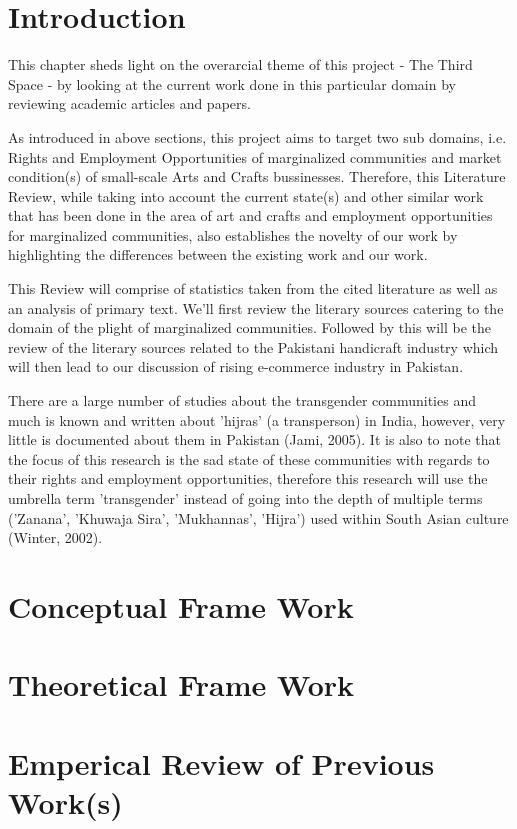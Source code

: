 
\section{Introduction}

This chapter sheds light on the overarcial theme of this project - The Third Space - by looking at the current work done in this particular domain by reviewing academic articles and papers.

As introduced in above sections, this project aims to target two sub domains, i.e. Rights and Employment Opportunities of marginalized communities and market condition(s) of small-scale Arts and Crafts bussinesses. Therefore, this Literature Review, while taking into account the current state(s) and other similar work that has been done in the area of art and crafts and employment opportunities for marginalized communities, also establishes the novelty of our work by highlighting the differences between the existing work and our work.

This Review will comprise of statistics taken from the cited literature as well as an analysis of primary text. We'll first review the literary sources catering to the domain of the plight of marginalized communities. Followed by this will be the review of the literary sources related to the Pakistani handicraft industry which will then lead to our discussion of rising e-commerce industry in Pakistan.

There are a large number of studies about the transgender communities and much is known and written about 'hijras' (a transperson) in India, however, very little is documented about them in Pakistan (Jami, 2005). It is also to note that the focus of this research is the sad state of these communities with regards to their rights and employment opportunities, therefore this research will use the umbrella term 'transgender' instead of going into the depth of multiple terms ('Zanana', 'Khuwaja Sira', 'Mukhannas', 'Hijra') used within South Asian culture (Winter, 2002). 

\section{Conceptual Frame Work}

\section{Theoretical Frame Work}

\section{Emperical Review of Previous Work(s)}

